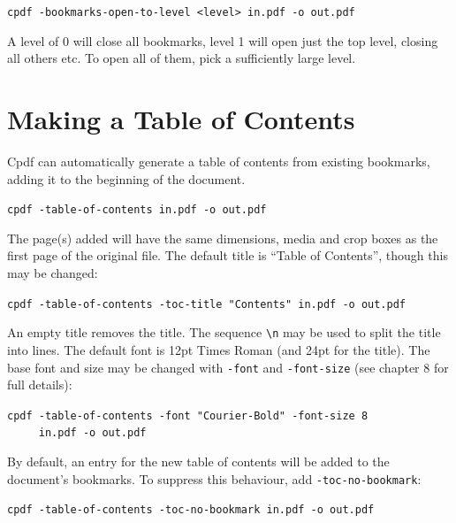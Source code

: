 \documentclass{book}
\begin{document}
  \begin{framed}
   \noindent\small\verb!cpdf -bookmarks-open-to-level <level> in.pdf -o out.pdf!
  \end{framed}

\noindent A level of 0 will close all bookmarks, level 1 will open just the top level, closing all others etc. To open all of them, pick a sufficiently large level.


\section{Making a Table of Contents}

Cpdf can automatically generate a table of contents from existing bookmarks, adding it to the beginning of the document.

  \begin{framed}
   \noindent\small\verb!cpdf -table-of-contents in.pdf -o out.pdf!
  \end{framed}

\noindent The page(s) added will have the same dimensions, media and crop boxes as the first page of the original file. The default title is ``Table of Contents'', though this may be changed:

  \begin{framed}
   \noindent\small\verb!cpdf -table-of-contents -toc-title "Contents" in.pdf -o out.pdf!
  \end{framed}

\noindent An empty title removes the title. The sequence \texttt{\textbackslash n} may be used to split the title into lines. The default font is 12pt Times Roman (and 24pt for the title). The base font and size may be changed with \texttt{-font} and \texttt{-font-size} (see chapter 8 for full details):

  \begin{framed}
   \noindent\small\verb!cpdf -table-of-contents -font "Courier-Bold" -font-size 8!\\
   \noindent\small\verb!     in.pdf -o out.pdf!
  \end{framed}

\noindent By default, an entry for the new table of contents will be added to the document's bookmarks. To suppress this behaviour, add \texttt{-toc-no-bookmark}:

  \begin{framed}
   \noindent\small\verb!cpdf -table-of-contents -toc-no-bookmark in.pdf -o out.pdf!
  \end{framed}
\end{document}
